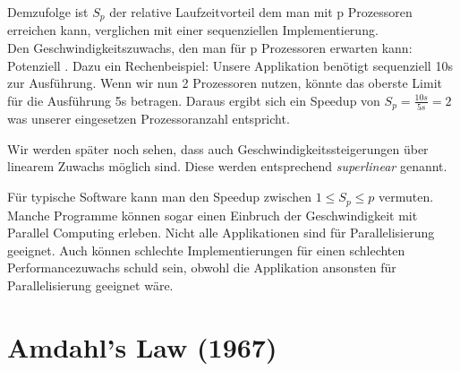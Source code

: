 \documentclass[twocolumn, a4paper, 10pt, DIV12]{scrreprt}
\begin{document}
Demzufolge ist \(S_p\) der relative Laufzeitvorteil dem man mit p Prozessoren erreichen kann, verglichen
mit einer sequenziellen Implementierung.\\

Den Geschwindigkeitszuwachs, den man für p Prozessoren erwarten kann: Potenziell .
Dazu ein Rechenbeispiel: Unsere Applikation benötigt sequenziell 10s zur Ausführung. Wenn wir
nun 2 Prozessoren nutzen, könnte das oberste Limit für die Ausführung 5s betragen. Daraus ergibt
sich ein Speedup von \( S_p = \frac{10s}{5s} = 2 \) was unserer eingesetzen Prozessoranzahl entspricht.

Wir werden später noch sehen, dass auch Geschwindigkeitssteigerungen über linearem Zuwachs möglich sind.
Diese werden entsprechend \textit{superlinear} genannt.

Für typische Software kann man den Speedup zwischen \( 1 \leq S_p \leq p \) vermuten. Manche Programme
können sogar einen Einbruch der Geschwindigkeit mit Parallel Computing erleben. Nicht alle Applikationen
sind für Parallelisierung geeignet. Auch können schlechte Implementierungen für einen schlechten
Performancezuwachs schuld sein, obwohl die Applikation ansonsten für Parallelisierung geeignet wäre.

\section*{Amdahl's Law (1967)}
\end{document}
